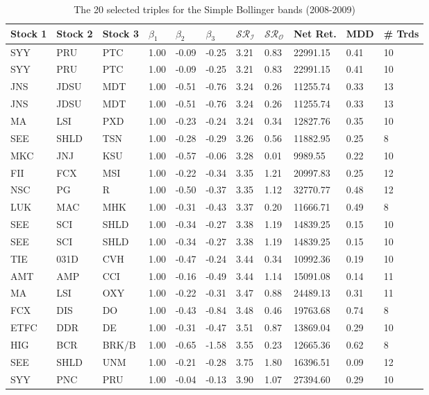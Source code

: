 \documentclass[11pt,a4,twosided,singlespacing,titlepagenumber=on]{scrreprt}
\numberwithin{equation}{chapter} %
\theoremstyle{remark}
\begin{document}
\renewcommand{\arraystretch}{0.8}%
\begin{table}[H]
\centering
\begin{tabular}{lllllllllll}
\hline
Stock 1 & Stock 2 & Stock 3 & $\beta_1$ & $\beta_2$ & $\beta_3$ & $\mathcal{SR}_\mathcal{I}$ & $\mathcal{SR}_\mathcal{O}$ & Net Ret. & MDD & \# Trds\\ \hline
SYY  & PRU  & PTC  & 1.00 & -0.09 & -0.25 & 3.21 & 0.83 & 22991.15 & 0.41 & 10 \\
SYY  & PRU  & PTC  & 1.00 & -0.09 & -0.25 & 3.21 & 0.83 & 22991.15 & 0.41 & 10 \\
JNS  & JDSU  & MDT  & 1.00 & -0.51 & -0.76 & 3.24 & 0.26 & 11255.74 & 0.33 & 13 \\
JNS  & JDSU  & MDT  & 1.00 & -0.51 & -0.76 & 3.24 & 0.26 & 11255.74 & 0.33 & 13 \\
MA  & LSI  & PXD  & 1.00 & -0.23 & -0.24 & 3.24 & 0.34 & 12827.76 & 0.35 & 10 \\
SEE  & SHLD  & TSN  & 1.00 & -0.28 & -0.29 & 3.26 & 0.56 & 11882.95 & 0.25 & 8 \\
MKC  & JNJ  & KSU  & 1.00 & -0.57 & -0.06 & 3.28 & 0.01 & 9989.55 & 0.22 & 10 \\
FII  & FCX  & MSI  & 1.00 & -0.22 & -0.34 & 3.35 & 1.21 & 20997.83 & 0.25 & 12 \\
NSC  & PG  & R  & 1.00 & -0.50 & -0.37 & 3.35 & 1.12 & 32770.77 & 0.48 & 12 \\
LUK  & MAC  & MHK  & 1.00 & -0.31 & -0.43 & 3.37 & 0.20 & 11666.71 & 0.49 & 8 \\
SEE  & SCI  & SHLD  & 1.00 & -0.34 & -0.27 & 3.38 & 1.19 & 14839.25 & 0.15 & 10 \\
SEE  & SCI  & SHLD  & 1.00 & -0.34 & -0.27 & 3.38 & 1.19 & 14839.25 & 0.15 & 10 \\
TIE  & 031D  & CVH  & 1.00 & -0.47 & -0.24 & 3.44 & 0.34 & 10992.36 & 0.19 & 10 \\
AMT  & AMP  & CCI  & 1.00 & -0.16 & -0.49 & 3.44 & 1.14 & 15091.08 & 0.14 & 11 \\
MA  & LSI  & OXY  & 1.00 & -0.22 & -0.31 & 3.47 & 0.88 & 24489.13 & 0.31 & 11 \\
FCX  & DIS  & DO  & 1.00 & -0.43 & -0.84 & 3.48 & 0.46 & 19763.68 & 0.74 & 8 \\
ETFC  & DDR  & DE  & 1.00 & -0.31 & -0.47 & 3.51 & 0.87 & 13869.04 & 0.29 & 10 \\
HIG  & BCR  & BRK/B  & 1.00 & -0.65 & -1.58 & 3.55 & 0.23 & 12665.36 & 0.62 & 8 \\
SEE  & SHLD  & UNM  & 1.00 & -0.21 & -0.28 & 3.75 & 1.80 & 16396.51 & 0.09 & 12 \\
SYY  & PNC  & PRU  & 1.00 & -0.04 & -0.13 & 3.90 & 1.07 & 27394.60 & 0.29 & 10 \\
\hline
\end{tabular}
\caption{The 20 selected triples for the Simple Bollinger bands (2008-2009)}
\label{20_selected_triples_simple_bands}
\end{table}
\end{document}
